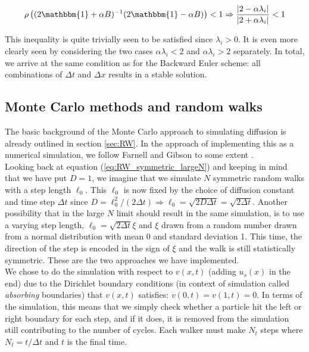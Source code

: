\documentclass[a4paper, 11pt, notitlepage,english]{article}
\newcommand{\id}{\mathbbm{1}}
\begin{document}
\begin{equation}
\rho\left( (2\id + \alpha B)^{-1}(2\id -\alpha B) \right) < 1 \Rightarrow \frac{\lvert 2-\alpha \lambda_i\rvert}{\lvert 2+\alpha \lambda_i \rvert} < 1
\label{eq:Crank_Nicolson_spectralrad}
\end{equation}

This inequality is quite trivially seen to be satisfied since $\lambda_i > 0$. It is even more clearly seen by considering the two cases $\alpha\lambda_i < 2$ and $\alpha\lambda_i > 2$ separately. In total, we arrive at the same condition as for the Backward Euler scheme: all combinations of $\Delta t$ and $\Delta x$ results in a stable solution.

\subsection{Monte Carlo methods and random walks}
\label{sec:MC_method}
The basic background of the Monte Carlo approach to simulating diffusion is already outlined in section \ref{sec:RW}. In the approach of implementing this as a numerical simulation, we follow Farnell and Gibson to some extent \cite{Farnell}. \\

Looking back at equation (\ref{eq:RW_symmetric_largeN}) and keeping in mind that we have put $D = 1$, we imagine that we simulate $N$ symmetric random walks with a step length $\ell_0$. This $\ell_0$ is now fixed by the choice of diffusion constant and time step $\Delta t$ since $D = \ell_0^2/(2\Delta t) \Rightarrow \ell_0 = \sqrt{2D\Delta t} = \sqrt{2\Delta t}$. Another possibility that in the large $N$ limit should result in the same simulation, is to use a varying step length, $\ell_0 = \sqrt{2\Delta t}\xi$ and $\xi$ drawn from a random number drawn from a normal distribution with mean 0 and standard deviation 1. This time, the direction of the step is encoded in the sign of $\xi$ and the walk is still statistically symmetric. These are the two approaches we have implemented.\\

We chose to do the simulation with respect to $v(x,t)$ (adding $u_s(x)$ in the end) due to the Dirichlet boundary conditions (in context of simulation called \emph{absorbing} boundaries) that $v(x,t)$ satisfies: $v(0,t) = v(1,t) = 0$. In terms of the simulation, this means that we simply check whether a particle hit the left or right boundary for each step, and if it does, it is removed from the simulation still contributing to the number of cycles. Each walker must make $N_t$ steps where $N_t = t/\Delta t$ and $t$ is the final time. \\
\end{document}
